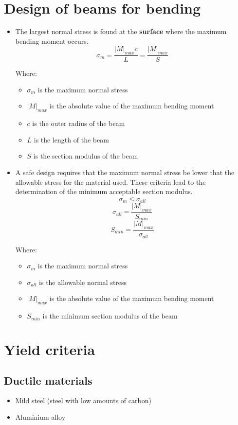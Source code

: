 \documentclass[11pt]{article}
\begin{document}
\section{Design of beams for bending}
\label{sec:org4b14baf}
\begin{itemize}
\item The largest normal stress is found at the \textbf{surface} where the maximum bending moment occurs.
\[\sigma_m = \frac{|M|_{max} c}{L} = \frac{|M|_{max}}{S}\]

Where:
\begin{itemize}
\item \(\sigma_m\) is the maximum normal stress
\item \(|M|_{max}\) is the absolute value of the maximum bending moment
\item \(c\) is the outer radius of the beam
\item \(L\) is the length of the beam
\item \(S\) is the section modulus of the beam
\end{itemize}

\item A safe design requires that the maximum normal stress be lower that the allowable stress for the material used. These criteria lead to the determination of the minimum acceptable section modulus.
\[\sigma_m \le \sigma_{all}\]
\[\sigma_{all} = \frac{|M|_{max}}{S_{min}}\]
\[S_{min} = \frac{|M|_{max}}{\sigma_{all}}\]

Where:
\begin{itemize}
\item \(\sigma_m\) is the maximum normal stress
\item \(\sigma_{all}\) is the allowable normal stress
\item \(|M|_{max}\) is the absolute value of the maximum bending moment
\item \(S_{min}\) is the minimum section modulus of the beam
\end{itemize}
\end{itemize}

\newpage
\section{Yield criteria}
\label{sec:org4135fdd}

\subsection{Ductile materials}
\label{sec:org29013bd}
\begin{itemize}
\item Mild steel (steel with low amounts of carbon)
\item Aluminium alloy
\end{itemize}
\end{document}
